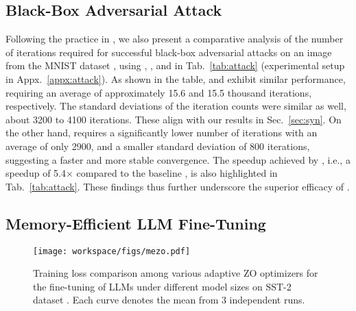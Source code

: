\subsection{Black-Box Adversarial Attack}\label{sec:attack}
\begin{table}[t]
\caption{
Comparison of the number of iterations to achieve a successful black-box adversarial attack.
Each cell represents mean $\pm$ standard deviation from five independent runs.
}
\label{tab:attack}
\centering
{}
\vspace{-3mm}
\end{table}

Following the practice in \citep{zord}, we also present a comparative analysis of the number of iterations required for successful black-box adversarial attacks on an image from the MNIST dataset \citep{lecun1998mnist}, using \rms{}, \base{}, and \ours{} in Tab.~\ref{tab:attack} (experimental setup in Appx.~\ref{appx:attack}).  As shown in the table, \rms{} and \base{} exhibit similar performance, requiring an average of approximately 15.6 and 15.5 thousand iterations, respectively. The standard deviations of the iteration counts were similar as well, about 3200 to 4100 iterations. These align with our results in Sec.~\ref{sec:syn}. On the other hand, \ours{} requires a significantly lower number of iterations with an average of only 2900, and a smaller standard deviation of 800 iterations, suggesting a faster and more stable convergence. The speedup achieved by \ours{}, i.e., a speedup of 5.4$\times$ compared to the baseline \rms{}, is also highlighted in Tab.~\ref{tab:attack}. These findings thus further underscore the superior efficacy of \ours{}.

\subsection{Memory-Efficient LLM Fine-Tuning}\label{sec:tuning}
\begin{figure}[t]
\vspace{-2mm}
\centering
\texttt{[image: workspace/figs/mezo.pdf]}
\caption{Training loss comparison among various adaptive ZO optimizers for the fine-tuning of LLMs under different model sizes on SST-2 dataset \citep{sst2}. Each curve denotes the mean from 3 independent runs.}
\label{fig:mezo}
\end{figure}

